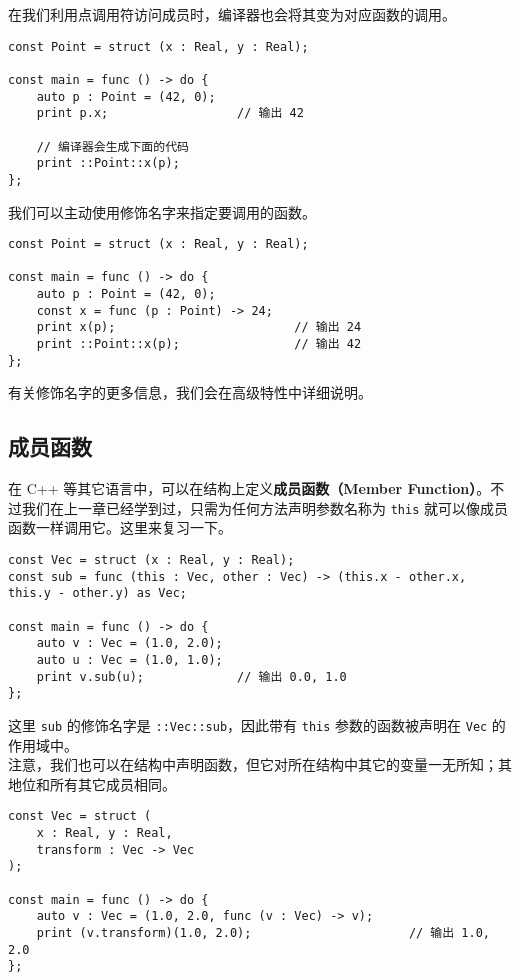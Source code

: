 在我们利用点调用符访问成员时，编译器也会将其变为对应函数的调用。

\begin{lstlisting}
const Point = struct (x : Real, y : Real);

const main = func () -> do {
	auto p : Point = (42, 0);
	print p.x;					// 输出 42

	// 编译器会生成下面的代码
	print ::Point::x(p);
};
\end{lstlisting}

我们可以主动使用修饰名字来指定要调用的函数。

\begin{lstlisting}
const Point = struct (x : Real, y : Real);

const main = func () -> do {
	auto p : Point = (42, 0);
	const x = func (p : Point) -> 24;
	print x(p);							// 输出 24
	print ::Point::x(p);				// 输出 42
};
\end{lstlisting}

有关修饰名字的更多信息，我们会在高级特性中详细说明。


\subsection{成员函数}

在 C++ 等其它语言中，可以在结构上定义\textbf{成员函数（Member Function）}。不过我们在上一章已经学到过，只需为任何方法声明参数名称为 \lstinline!this! 就可以像成员函数一样调用它。这里来复习一下。

\begin{lstlisting}
const Vec = struct (x : Real, y : Real);
const sub = func (this : Vec, other : Vec) -> (this.x - other.x, this.y - other.y) as Vec;

const main = func () -> do {
	auto v : Vec = (1.0, 2.0);
	auto u : Vec = (1.0, 1.0);
	print v.sub(u);				// 输出 0.0, 1.0
};
\end{lstlisting}

这里 \lstinline!sub! 的修饰名字是 \lstinline!::Vec::sub!，因此带有 \lstinline!this! 参数的函数被声明在 \lstinline!Vec! 的作用域中。 \\

注意，我们也可以在结构中声明函数，但它对所在结构中其它的变量一无所知；其地位和所有其它成员相同。

\begin{lstlisting}
const Vec = struct (
	x : Real, y : Real,
	transform : Vec -> Vec
);

const main = func () -> do {
	auto v : Vec = (1.0, 2.0, func (v : Vec) -> v);
	print (v.transform)(1.0, 2.0);						// 输出 1.0, 2.0
};
\end{lstlisting}

